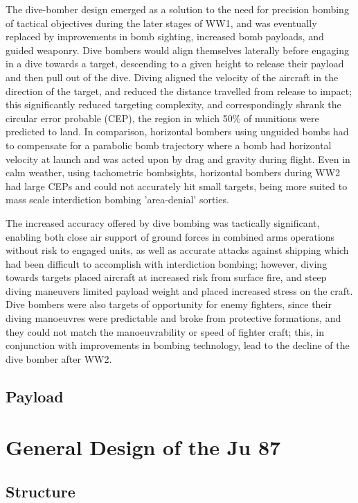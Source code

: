 \documentclass[a4paper, fontsize=11pt]{scrartcl} %
\begin{document}
The dive-bomber design emerged as a solution to the need for precision
bombing of tactical objectives during the later stages of
WW1, and was eventually replaced by improvements in bomb sighting,
increased bomb payloads, and guided weaponry. Dive bombers would align themselves
laterally before engaging in a dive towards a target,
descending to a given height to release their payload and then pull
out of the dive. Diving aligned the velocity of the aircraft in the
direction of the target, and reduced the distance travelled from release
to impact; this significantly reduced targeting complexity, and
correspondingly shrank the circular error probable (CEP), the
region in which 50\% of munitions were predicted to land. In comparison,
horizontal bombers using unguided bombs had to compensate for a parabolic
bomb trajectory where a bomb had horizontal velocity at launch and was
acted upon by drag and gravity during flight. Even in
calm weather, using tachometric bombsights, horizontal bombers during
WW2 had large CEPs and could not accurately hit small targets, being
more suited to mass scale interdiction bombing 'area-denial' sorties.

The increased accuracy offered by dive bombing was tactically
significant, enabling both close air support
of ground forces in combined arms operations without risk to engaged
units, as well as accurate attacks against shipping which had been
difficult to accomplish with interdiction bombing; however, diving
towards targets placed aircraft at increased risk from surface fire, and
steep diving maneuvers limited payload weight and placed increased
stress on the craft. Dive bombers were also targets of opportunity for
enemy fighters, since their diving manoeuvres were predictable and broke from
protective formations, and they could not match the manoeuvrability or
speed of fighter craft; this, in conjunction with improvements in
bombing technology, lead to the decline of the dive bomber after WW2.
\subsection{Payload}
\section{General Design of the Ju 87}

\subsection{Structure}
\end{document}
